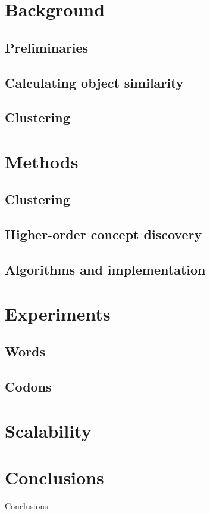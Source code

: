 \documentclass{sig-alternate}
\begin{document}
\section{Background}

\subsection{Preliminaries}
\label{sec:preliminaries}

\subsection{Calculating object similarity}

\subsection{Clustering}

\section{Methods}
\label{sec:methods}

\subsection{Clustering}

\subsection{Higher-order concept discovery}

\subsection{Algorithms and implementation}
\label{subsec:algorithmsAndImplementation}


\section{Experiments}

\subsection{Words}
\label{subsec:words}

\subsection{Codons}

\section{Scalability}
\label{sec: scalability}


\section{Conclusions}

Conclusions.

\newpage




\balancecolumns
\end{document}
